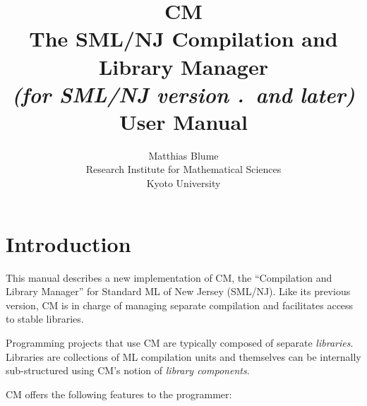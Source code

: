\documentclass[titlepage,letterpaper]{article}
\author{Matthias Blume \\
Research Institute for Mathematical Sciences \\
Kyoto University}
\title{{\bf CM}\\
The SML/NJ Compilation and Library Manager \\
{\it\small (for SML/NJ version \smlmj.\smlmn~and later)} \\
User Manual}
\begin{document}


\maketitle

\pagebreak

\tableofcontents

\pagebreak

\section{Introduction}

This manual describes a new implementation of CM, the ``Compilation
and Library Manager'' for Standard ML of New Jersey (SML/NJ).  Like its
previous version, CM is in charge of managing separate compilation and
facilitates access to stable libraries.

Programming projects that use CM are typically composed of separate
{\em libraries}.  Libraries are collections of ML compilation units
and themselves can be internally sub-structured using CM's notion of
{\em library components}.

CM offers the following features to the programmer:
\end{document}
